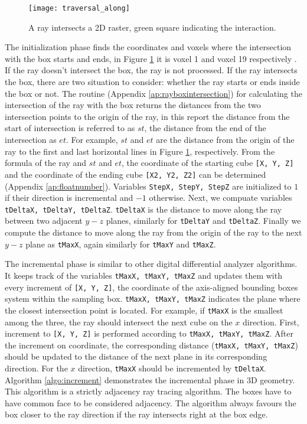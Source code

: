 \begin{figure}[h]
    \centering
    \texttt{[image: traversal\_along]}
    \caption{A ray intersects a 2D raster, green square indicating the interaction.}
    \label{fig:traversal_along}
\end{figure}

The initialization phase finds the coordinates and voxels where the intersection with the box starts and ends, in Figure \ref{fig:traversal_along} it is voxel 1 and voxel 19 respectively \cite{smits}. If the ray doesn't intersect the box, the ray is not processed. If the ray intersects the box, there are two situation to consider: whether the ray starts or ends inside the box or not. The routine (Appendix \ref{ap:rayboxintersection}) for calculating the intersection of the ray with the box returns the distances from the two intersection points to the origin of the ray, in this report the distance from the start of intersection is referred to as $st$, the distance from the end of the intersection as $et$. For example, $st$ and $et$ are the distance from the origin of the ray to the first and last horizontal lines in Figure \ref{fig:traversal_along}, respectively. From the formula of the ray and $st$ and $et$, the coordinate of the starting cube \texttt{[X, Y, Z]} and the coordinate of the ending cube \texttt{[X2, Y2, Z2]} can be determined (Appendix \ref{ap:floatnumber}). Variables \texttt{StepX, StepY, StepZ} are initialized to $1$ if their direction is incremental and $-1$ otherwise. Next, we compuate variables \texttt{tDeltaX, tDeltaY, tDeltaZ}. \texttt{tDeltaX} is the distance to move along the ray between two adjacent $y-z$ planes, similarly for \texttt{tDeltaY} and \texttt{tDeltaZ}. Finally we compute the distance to move along the ray from the origin of the ray to the next $y-z$ plane as \texttt{tMaxX}, again similarly for \texttt{tMaxY} and \texttt{tMaxZ}.

The incremental phase is similar to other digital differential analyzer algorithms. It keeps track of the variables \texttt{tMaxX, tMaxY, tMaxZ} and updates them with every increment of \texttt{[X, Y, Z]}, the coordinate of the axis-aligned bounding boxes system within the sampling box. \texttt{tMaxX, tMaxY, tMaxZ} indicates the plane where the closest intersection point is located. For example, if \texttt{tMaxX} is the smallest among the three, the ray should intersect the next cube on the $x$ direction. First, increment to \texttt{[X, Y, Z]} is performed according to \texttt{tMaxX, tMaxY, tMaxZ}. After the increment on coordinate, the corresponding distance (\texttt{tMaxX, tMaxY, tMaxZ}) should be updated to the distance of the next plane in its corresponding direction. For the $x$ direction, \texttt{tMaxX} should be incremented by \texttt{tDeltaX}. Algorithm \ref{algo:increment} demonstrates the incremental phase in 3D geometry. This algorithm is a strictly adjacency ray tracing algorithm. The boxes have to have common face to be considered adjacency. The algorithm always favours the box closer to the ray direction if the ray intersects right at the box edge.

